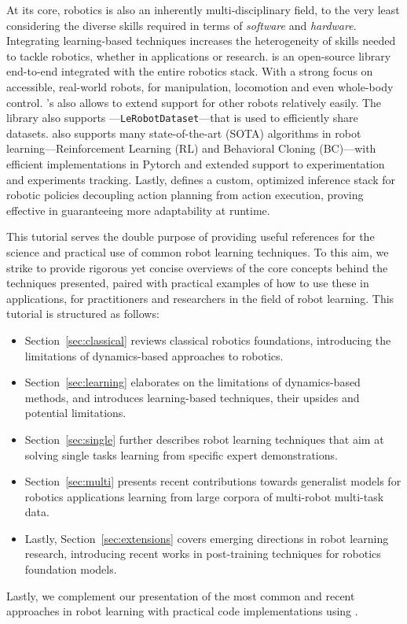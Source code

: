 At its core, robotics is also an inherently multi-disciplinary field, to the very least considering the diverse skills required in terms of \emph{software} and \emph{hardware}.
Integrating learning-based techniques increases the heterogeneity of skills needed to tackle robotics, whether in applications or research.
\lerobot is an open-source library end-to-end integrated with the entire robotics stack.
With a strong focus on accessible, real-world robots,  for manipulation, locomotion and even whole-body control. 
\lerobot's  also allows to extend support for other robots relatively easily. 
The library also supports ---\texttt{LeRobotDataset}---that is used to efficiently share datasets. 
\lerobot also supports many state-of-the-art (SOTA) algorithms in robot learning---Reinforcement Learning (RL) and Behavioral Cloning (BC)---with efficient implementations in Pytorch and extended support to experimentation and experiments tracking.
Lastly, \lerobot defines a custom, optimized inference stack for robotic policies decoupling action planning from action execution, proving effective in guaranteeing more adaptability at runtime.

This tutorial serves the double purpose of providing useful references for the science and practical use of common robot learning techniques.
To this aim, we strike to provide rigorous yet concise overviews of the core concepts behind the techniques presented, paired with practical examples of how to use these in applications, for practitioners and researchers in the field of robot learning.
This tutorial is structured as follows:
\begin{itemize}
\item Section~\ref{sec:classical} reviews classical robotics foundations, introducing the limitations of dynamics-based approaches to robotics.
\item Section~\ref{sec:learning} elaborates on the limitations of dynamics-based methods, and introduces learning-based techniques, their upsides and potential limitations.
\item Section~\ref{sec:single} further describes robot learning techniques that aim at solving single tasks learning from specific expert demonstrations.
\item Section~\ref{sec:multi} presents recent contributions towards generalist models for robotics applications learning from large corpora of multi-robot multi-task data.
\item Lastly, Section~\ref{sec:extensions} covers emerging directions in robot learning research, introducing recent works in post-training techniques for robotics foundation models.
\end{itemize}

Lastly, we complement our presentation of the most common and recent approaches in robot learning with practical code implementations using \lerobot.
